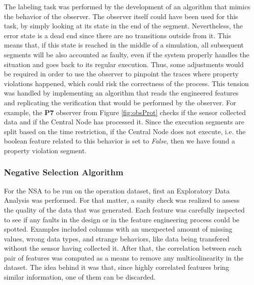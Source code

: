 The labeling task was performed by the development of an algorithm that mimics the behavior of the observer. The observer itself could have been used for this task, by simply looking at its state in the end of the segment. Nevertheless, the error state is a dead end since there are no transitions outside from it. This means that, if this state is reached in the middle of a simulation, all subsequent segments will be also accounted as faulty, even if the system properly handles the situation and goes back to its regular execution. Thus, some adjustments would be required in order to use the observer to pinpoint the traces where property violations happened, which could risk the correctness of the process. This tension was handled by implementing an algorithm that reads the engineered features and replicating the verification that would be performed by the observer. For example, the \textbf{P7} observer from Figure \ref{fig:obsProt} checks if the sensor collected data and if the Central Node has processed it. Since the execution segments are split based on the time restriction, if the Central Node does not execute, i.e. the boolean feature related to this behavior is set to \textit{False}, then we have found a property violation segment. 

\subsubsection{Negative Selection Algorithm}

For the NSA to be run on the operation dataset, first an Exploratory Data Analysis was performed. For that matter, a sanity check was realized to assess the quality of the data that was generated. Each feature was carefully inspected to see if any faults in the design or in the feature engineering process could be spotted. Examples included columns with an unexpected amount of missing values, wrong data types, and strange behaviors, like data being transfered without the sensor having collected it. After that, the correlation between each pair of features was computed as a means to remove any multicolinearity in the dataset. The idea behind it was that, since highly correlated features bring similar information, one of them can be discarded.

